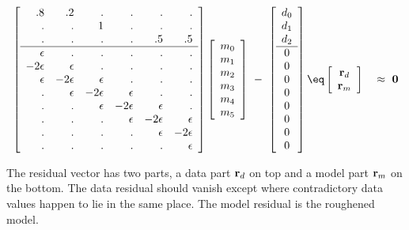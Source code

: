 \begin{equation} { 
\left[ 
\begin{array}{rrrrrr}
   .8 & .2 & .  & .  & .  & .  \\
   .  & .  & 1  & .  & .  & .  \\
   .  & .  & .  & .  & .5 & .5 \\
   \hline
   \E & .  & .  & .  & .  & .  \\
  -2\E& \E & .  & .  & .  & .  \\
   \E &-2\E&  \E& .  & .  & .  \\
   .  & \E &-2\E&  \E& .  & .  \\
   .  & .  &  \E&-2\E&  \E& .  \\
   .  & .  & .  &  \E&-2\E&  \E\\
   .  & .  & .  & .  &  \E&-2\E\\
   .  & .  & .  & .  & .  &  \E
  \end{array} \right] 
\left[ 
        \begin{array}{c}
          m_0 \\ 
          m_1 \\ 
          m_2 \\ 
          m_3 \\ 
          m_4 \\ 
          m_5 
        \end{array}
\right] 
\ -\ 
\left[ 
\begin{array}{c}
  d_0 \\ 
  d_1 \\ 
  d_2 \\ 
  \hline
  0   \\
  0   \\
  0   \\
  0   \\
  0   \\
  0   \\
  0   \\
  0
  \end{array} \right] 
\eq
\left[ 
\begin{array}{c}
  \bold r_d \\ 
  \bold r_m 
  \end{array} \right] 
\quad \approx \ \bold 0
\label{eqn:tworegexam}
} \end{equation}
\par
The residual vector has two parts,
a data part $\bold r_d$ on top
and a model part $\bold r_m$ on the bottom.
The data residual
should vanish except where contradictory data values
happen to lie in the same place.
The model residual is the roughened model.

